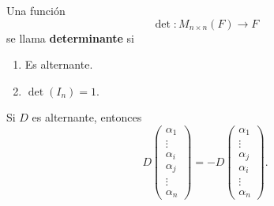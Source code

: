 \documentclass[12pt,a4paper]{book}
\begin{document}
    \begin{definicion}
        Una función
        \[
        \det:M_{n \times n}(F) \longrightarrow F
        \]
        se llama \textbf{determinante} si
        \begin{enumerate}
            \item Es alternante.
            \item $\det(I_n) = 1$.
        \end{enumerate}
    \end{definicion}

    \begin{lema}
        Si $D$ es alternante, entonces
        \[
        D\begin{pmatrix}
            \alpha_1\\
            \vdots\\
            \alpha_i\\
            \alpha_j\\
            \vdots\\
            \alpha_n
        \end{pmatrix} = -D
        \begin{pmatrix}
            \alpha_1\\
            \vdots\\
            \alpha_j\\
            \alpha_i\\
            \vdots\\
            \alpha_n
        \end{pmatrix}.
        \]
    \end{lema}
    
\end{document}
